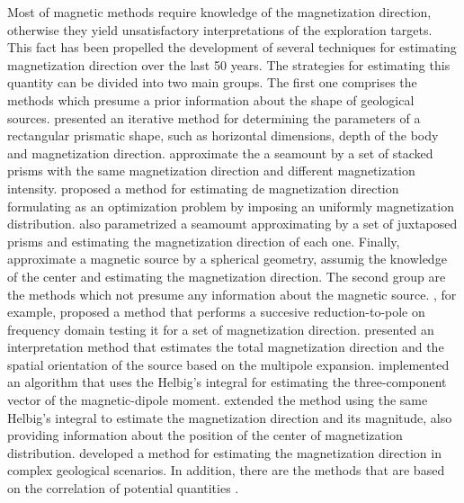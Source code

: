 Most of  magnetic methods require knowledge of the magnetization direction, otherwise they yield unsatisfactory interpretations of the exploration targets. This fact has been propelled the development of several techniques for estimating magnetization direction over the last 50 years. The strategies for estimating this quantity can be divided into two main groups. The first one comprises the methods which presume a prior information about the shape of geological sources. \cite{bhattacharyya1966} presented an iterative method for determining the parameters of a rectangular prismatic shape, such as horizontal dimensions, depth of the body and magnetization direction. \cite{emilia_massey_1974} approximate the a seamount by a set of stacked prisms with the same magnetization direction and different magnetization intensity. \cite{parker_etal_1987} proposed a method for estimating de magnetization direction formulating as an optimization problem by imposing an uniformly magnetization distribution. \cite{kubota2005} also parametrized a seamoumt approximating by a set of juxtaposed prisms and estimating the magnetization direction of each one. Finally, \cite{oliveirajr_etal_2015} approximate a magnetic source by a spherical geometry, assumig the knowledge of the center and estimating the magnetization direction. The second group are the methods which not presume any information about the magnetic source. \cite{fedi_etal_1994}, for example, proposed a method that performs a succesive reduction-to-pole on frequency domain testing it for a set of magnetization direction. \cite{medeiros_silva_1995} presented an interpretation method that estimates the total magnetization direction and the spatial orientation of the source based on the multipole expansion. \cite{phillips2005} implemented an algorithm that uses the Helbig's integral for estimating the three-component vector of the magnetic-dipole moment. \cite{tontini_pedersen_2008} extended the method using the same Helbig's integral to estimate the magnetization direction and its magnitude, also providing information about the position of the center of magnetization distribution. \cite{lelievre_oldenburg_2009} developed a method for estimating the magnetization direction in complex geological scenarios. In addition, there are the methods that are based on the correlation of potential quantities \citep[e.g.,][]{dannemiller_li_2006,gerovska_etal_2009,liu_etal_2015,zhang_etal_2018}.

